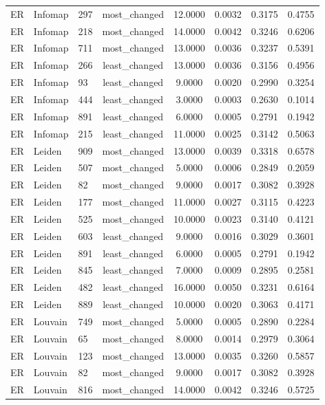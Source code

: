 \begin{longtable}{lllccccc}
ER & Infomap & 297 & most\_changed & 12.0000 & 0.0032 & 0.3175 & 0.4755 \\
ER & Infomap & 218 & most\_changed & 14.0000 & 0.0042 & 0.3246 & 0.6206 \\
ER & Infomap & 711 & most\_changed & 13.0000 & 0.0036 & 0.3237 & 0.5391 \\
ER & Infomap & 266 & least\_changed & 13.0000 & 0.0036 & 0.3156 & 0.4956 \\
ER & Infomap & 93 & least\_changed & 9.0000 & 0.0020 & 0.2990 & 0.3254 \\
ER & Infomap & 444 & least\_changed & 3.0000 & 0.0003 & 0.2630 & 0.1014 \\
ER & Infomap & 891 & least\_changed & 6.0000 & 0.0005 & 0.2791 & 0.1942 \\
ER & Infomap & 215 & least\_changed & 11.0000 & 0.0025 & 0.3142 & 0.5063 \\
ER & Leiden & 909 & most\_changed & 13.0000 & 0.0039 & 0.3318 & 0.6578 \\
ER & Leiden & 507 & most\_changed & 5.0000 & 0.0006 & 0.2849 & 0.2059 \\
ER & Leiden & 82 & most\_changed & 9.0000 & 0.0017 & 0.3082 & 0.3928 \\
ER & Leiden & 177 & most\_changed & 11.0000 & 0.0027 & 0.3115 & 0.4223 \\
ER & Leiden & 525 & most\_changed & 10.0000 & 0.0023 & 0.3140 & 0.4121 \\
ER & Leiden & 603 & least\_changed & 9.0000 & 0.0016 & 0.3029 & 0.3601 \\
ER & Leiden & 891 & least\_changed & 6.0000 & 0.0005 & 0.2791 & 0.1942 \\
ER & Leiden & 845 & least\_changed & 7.0000 & 0.0009 & 0.2895 & 0.2581 \\
ER & Leiden & 482 & least\_changed & 16.0000 & 0.0050 & 0.3231 & 0.6164 \\
ER & Leiden & 889 & least\_changed & 10.0000 & 0.0020 & 0.3063 & 0.4171 \\
ER & Louvain & 749 & most\_changed & 5.0000 & 0.0005 & 0.2890 & 0.2284 \\
ER & Louvain & 65 & most\_changed & 8.0000 & 0.0014 & 0.2979 & 0.3064 \\
ER & Louvain & 123 & most\_changed & 13.0000 & 0.0035 & 0.3260 & 0.5857 \\
ER & Louvain & 82 & most\_changed & 9.0000 & 0.0017 & 0.3082 & 0.3928 \\
ER & Louvain & 816 & most\_changed & 14.0000 & 0.0042 & 0.3246 & 0.5725 \\

\end{longtable}
